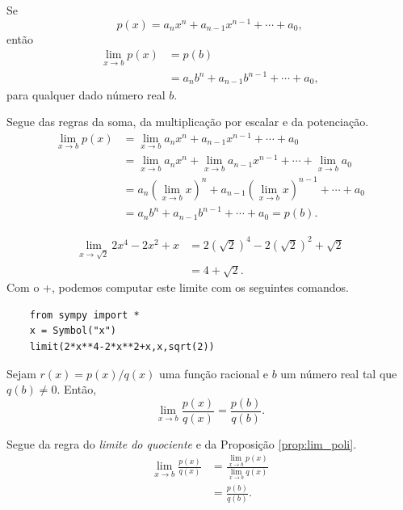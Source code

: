 \begin{prop}\label{prop:lim_poli}
  Se
  \begin{equation}
    p(x) = a_nx^n + a_{n-1}x^{n-1} + \cdots + a_0,
  \end{equation}
  então
  \begin{align}
    \lim_{x\to b} p(x) &= p(b)\\
                       &= a_nb^n + a_{n-1}b^{n-1} + \cdots + a_0,
  \end{align}
  para qualquer dado número real $b$.
\end{prop}
\begin{dem}
  Segue das regras da soma, da multiplicação por escalar e da potenciação.
  \begin{align}
    \lim_{x\to b} p(x) &= \lim_{x\to b} a_nx^n + a_{n-1}x^{n-1} + \cdots + a_0\\
                       &= \lim_{x\to b} a_nx^n + \lim_{x\to b} a_{n-1}x^{n-1} + \cdots + \lim_{x\to b} a_0\\
                       &= a_n\left(\lim_{x\to b} x\right)^n + a_{n-1}\left(\lim_{x\to b} x\right)^{n-1} + \cdots + a_0\\
                       &= a_nb^n + a_{n-1}b^{n-1} + \cdots + a_0 = p(b).
  \end{align}
\end{dem}

\begin{ex}
  \begin{align}
    \lim_{x\to \sqrt{2}} 2x^4 - 2x^2 + x &= 2(\sqrt{2})^4 - 2(\sqrt{2})^2 + \sqrt{2}\\
                                         &= 4+\sqrt{2}.
  \end{align}
  \ifispython
  Com o {\python}+{\sympy}, podemos computar este limite com os seguintes comandos.
  \begin{lstlisting}
    from sympy import *
    x = Symbol("x")
    limit(2*x**4-2*x**2+x,x,sqrt(2))
  \end{lstlisting}
  \fi
\end{ex}

\begin{prop}
  Sejam $r(x) = p(x)/q(x)$ uma função racional e $b$ um número real tal que $q(b)\neq 0$. Então,
  \begin{equation}
    \lim_{x\to b} \frac{p(x)}{q(x)} = \frac{p(b)}{q(b)}.
  \end{equation}
\end{prop}
\begin{dem}
  Segue da regra do \emph{limite do quociente} e da Proposição \ref{prop:lim_poli}.
  \begin{align}
    \lim_{x\to b} \frac{p(x)}{q(x)} &= \frac{\displaystyle\lim_{x\to b} p(x)}{\displaystyle\lim_{x\to b} q(x)} \\
                                    &= \frac{p(b)}{q(b)}.
  \end{align}
\end{dem}

